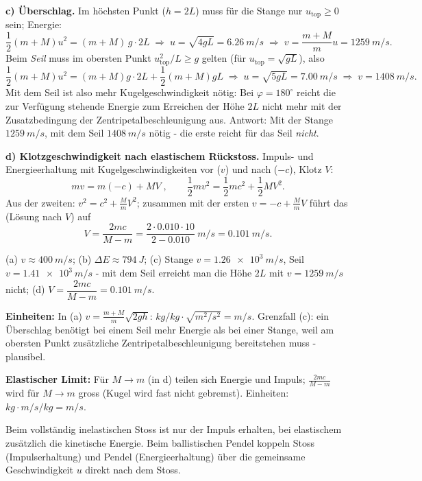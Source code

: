 \textbf{c) Überschlag.} Im höchsten Punkt ($h=2L$) muss für die Stange nur
$u_{\mathrm{top}}\ge 0$ sein; Energie:
\begin{equation}
  \frac12 (m+M)u^2 = (m+M)\,g\cdot 2L\;\Rightarrow\;
  u=\sqrt{4gL}=\qty{6.26}{m/s}
  \;\Rightarrow\;
  v = \frac{m+M}{m}u=\qty{1259}{m/s}.
\end{equation}
Beim \emph{Seil} muss im obersten Punkt $u_{\mathrm{top}}^2/L \ge g$ gelten
(für $u_{\mathrm{top}}=\sqrt{gL}$), also
\begin{equation}
  \frac12 (m+M)u^2 = (m+M)g\cdot 2L + \frac12(m+M)gL
  \;\Rightarrow\; u=\sqrt{5gL}=\qty{7.00}{m/s}
  \;\Rightarrow\; v=\qty{1408}{m/s}.
\end{equation}
Mit dem Seil ist also mehr Kugelgeschwindigkeit nötig: Bei
$\varphi=180^\circ$ reicht die zur Verfügung stehende Energie zum Erreichen
der Höhe $2L$ nicht mehr mit der Zusatzbedingung der Zentripetalbeschleunigung
aus. Antwort: Mit der Stange $\qty{1259}{m/s}$, mit dem Seil $\qty{1408}{m/s}$
nötig - die erste reicht für das Seil \emph{nicht}.

\textbf{d) Klotzgeschwindigkeit nach elastischem Rückstoss.} Impuls- und
Energieerhaltung mit Kugelgeschwindigkeiten vor ($v$) und nach ($-c$), Klotz
$V$:
\begin{equation*}
  m v = m(-c) + M V\;,\qquad
  \frac12 m v^2 = \frac12 m c^2 + \frac12 M V^2.
\end{equation*}
Aus der zweiten: $v^2 = c^2 + \frac{M}{m}V^2$; zusammen mit der ersten
$v = -c+\frac{M}{m}V$ führt das (Lösung nach $V$) auf
\begin{equation}
  V = \frac{2mc}{M-m}
  = \frac{2\cdot 0.010\cdot 10}{2-0.010}\ \si{m/s}
  = \qty{0.101}{m/s}.
\end{equation}

\begin{ergebnis}
(a) $v\approx\qty{400}{m/s}$; (b) $\Delta E\approx\qty{794}{J}$;
(c) Stange $v=\qty{1.26e3}{m/s}$, Seil $v=\qty{1.41e3}{m/s}$ - mit dem
Seil erreicht man die Höhe $2L$ mit $v=\qty{1259}{m/s}$ nicht;
(d) $V=\dfrac{2mc}{M-m}=\qty{0.101}{m/s}$.
\end{ergebnis}

\begin{kontrolle}
\textbf{Einheiten:} In (a)
$v=\tfrac{m+M}{m}\sqrt{2gh}$: $kg/kg\cdot\sqrt{m^2/s^2}=m/s$. \checkmark
Grenzfall (c): ein Überschlag benötigt bei einem Seil mehr Energie als bei
einer Stange, weil am obersten Punkt zusätzliche Zentripetalbeschleunigung
bereitstehen muss - plausibel.

\textbf{Elastischer Limit:} Für $M\to m$ (in d) teilen sich Energie und
Impuls; $\frac{2m c}{M-m}$ wird für $M\to m$ gross (Kugel wird fast nicht
gebremst). Einheiten: $kg\cdot m/s/kg = m/s$. \checkmark
\end{kontrolle}

\begin{merksatz}
Beim vollständig inelastischen Stoss ist nur der Impuls erhalten, bei
elastischem zusätzlich die kinetische Energie. Beim ballistischen Pendel
koppeln Stoss (Impulserhaltung) und Pendel (Energieerhaltung) über die
gemeinsame Geschwindigkeit $u$ direkt nach dem Stoss.
\end{merksatz}
